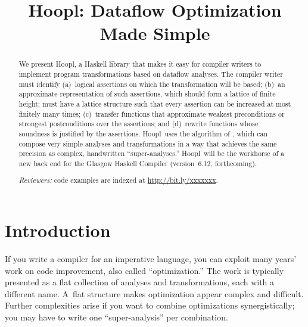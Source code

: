 \documentclass[blockstyle,preprint,natbib,nocopyrightspace]{sigplanconf}
\newcommand\ourlib{Hoopl}  %
\def\authornote#1{\unskip\relax}
\newcommand{\simon}[1]{\authornote{SLPJ: #1}}
\begin{document}
\title{\ourlib: Dataflow Optimization Made Simple}



\maketitle
 
\begin{abstract}
We present \ourlib, a Haskell library that makes it easy for compiler writers
to implement program transformations based on dataflow analyses.
The compiler writer must identify (a)~logical assertions
on which the transformation will be based;
(b)~an {approximate}
representation of such assertions, which
\ifcutting
should form a lattice of finite height;
\else
must have a lattice structure
 such that every assertion can be increased at
most finitely many times;
\fi
(c)~transfer functions that approximate weakest preconditions or
strongest postconditions over the assertions; and
(d)~rewrite functions whose soundness is justified by the assertions.
\ourlib\ uses the algorithm of 
\citet{lerner-grove-chambers:2002}, which 
can
compose very simple analyses and transformations in a way that achieves
the same precision as complex, handwritten
``super-analyses.''
\ourlib\ will be the workhorse of a new
back end for the Glasgow Haskell Compiler (version~6.12, forthcoming).

\emph{Reviewers:} code examples are indexed at {\small\url{http://bit.ly/xxxxxxx}.}
\end{abstract}

\makeatactive   %

\section{Introduction}

If you write a compiler for an imperative language, you can exploit
many years' work on code improvement, also called
``optimization.''
The work is typically presented
as a flat collection of analyses and
transformations, each with a different name.
A~flat structure makes optimization appear complex and difficult.
Further complexities arise if you want to combine optimizations
synergistically; you may have to write one ``super-analysis'' per
combination. 
\end{document}
